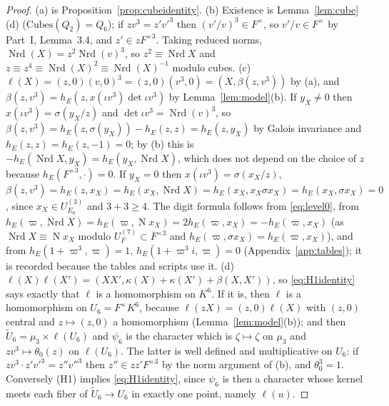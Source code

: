 \documentclass[11pt]{article}
\newcommand{\Nm}{\operatorname N}
\newcommand{\Nrd}{\operatorname{Nrd}}
\newcommand{\tU}{\widetilde U}
\newcommand{\Cubes}{\mathrm{Cubes}}
\theoremstyle{plain}
\theoremstyle{definition}
\begin{document}
\begin{proof}
(a) is Proposition~\ref{prop:cubeidentity}.  (b) Existence is
Lemma~\ref{lem:cube}(d) ($\Cubes(Q_2)=Q_6$); if $zv^3=z'v'^3$ then
$(v'/v)^3\in F^\times$, so $v'/v\in F^\times$ by Part~I, Lemma~3.4, and
$z'\in zF^{\times3}$.  Taking reduced norms, $\Nrd(X)=z^2\Nrd(v)^3$, so
$z^2\equiv\Nrd X$ and $z\equiv z^4\equiv\Nrd(X)^2\equiv\Nrd(X)^{-1}$
modulo cubes.  (c) $\ell(X)=(z,0)(v,0)^3=(z,0)(v^3,0)=(X,\beta(z,v^3))$
by (a), and $\beta(z,v^3)=h_E(z,x(\iota v^3)\det\iota v^3)$ by
Lemma~\ref{lem:model}(b).  If $y_X\ne0$ then $x(\iota v^3)=\sigma(y_X/z)$
and $\det\iota v^3=\Nrd(v)^3$, so
$\beta(z,v^3)=h_E(z,\sigma(y_X))-h_E(z,z)=h_E(z,y_X)$ by Galois
invariance and $h_E(z,z)=h_E(z,-1)=0$; by (b) this is
$-h_E(\Nrd X,y_X)=h_E(y_X,\Nrd X)$, which does not depend on the choice
of $z$ because $h_E(F^{\times3},\cdot)=0$.  If $y_X=0$ then
$x(\iota v^3)=\sigma(x_X/z)$, $\beta(z,v^3)=h_E(z,x_X)=h_E(x_X,\Nrd X)=h_E(x_X,x_X\sigma x_X)=h_E(x_X,\sigma x_X)=0$,
since $x_X\in U^{(3)}_{E_0}$ and $3+3\ge4$.  The digit formula follows
from \eqref{eq:level0}, from $h_E(\varpi,\Nrd X)=h_E(\varpi,\Nm x_X)=2h_E(\varpi,x_X)=-h_E(\varpi,x_X)$
(as $\Nrd X\equiv\Nm x_X$ modulo $U^{(7)}_F\subset F^{\times3}$ and
$h_E(\varpi,\sigma x_X)=h_E(\varpi,x_X)$), and from $h_E(1+\varpi^3,\varpi)=1$,
$h_E(1+\varpi^3i,\varpi)=0$ (Appendix~\ref{app:tables}); it is recorded
because the tables and scripts use it.  (d)
$\ell(X)\ell(X')=(XX',\kappa(X)+\kappa(X')+\beta(X,X'))$, so
\eqref{eq:H1identity} says exactly that $\ell$ is a homomorphism on
$K^6$.  If it is, then $\ell$ is a homomorphism on $U_6=F^\times K^6$,
because $\ell(zX)=(z,0)\ell(X)$ with $(z,0)$ central and $z\mapsto(z,0)$
a homomorphism (Lemma~\ref{lem:model}(b)); and then
$\tU_6=\mu_3\times\ell(U_6)$ and $\psi_6$ is the character which is
$\zeta\mapsto\zeta$ on $\mu_3$ and $zv^3\mapsto\theta_0(z)$ on
$\ell(U_6)$.  The latter is well defined and multiplicative on $U_6$:
if $zv^3\cdot z'v'^3=z''v''^3$ then $z''\in zz'F^{\times3}$ by the norm
argument of (b), and $\theta_0^3=1$.  Conversely (H1) implies
\eqref{eq:H1identity}, since $\psi_6$ is then a character whose kernel
meets each fiber of $\tU_6\to U_6$ in exactly one point, namely
$\ell(u)$.
\end{proof}
\end{document}
